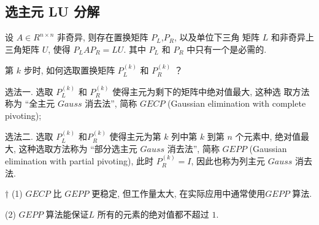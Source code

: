 \documentclass[12pt,a4paper]{article}
\begin{document}
\subsection{选主元 LU 分解}

\begin{theorem}
	设 $A ∈ R^{n×n}$ 非奇异, 则存在置换矩阵 $P_L$,$ P_R$, 以及单位下三角
	矩阵 $L$ 和非奇异上三角矩阵 $U$, 使得 $P_LAP_R = LU$. 其中 $P_L$ 和 $P_R$ 中只有一个是必需的.
\end{theorem}


第 $k$ 步时, 如何选取置换矩阵 $P^{(k)}_L$ 和 $P^{(k)}_R$ ？

选法一. 选取 $P^{(k)}_L$ 和 $P^{(k)}_R$ 使得主元为剩下的矩阵中绝对值最大, 这种选
取方法称为 “全主元 $Gauss$ 消去法”, 简称 $GECP$ (Gaussian elimination
with complete pivoting);

选法二. 选取 $P^{(k)}_L$ 和$ P^{(k)}_R$ 使得主元为第 $k$ 列中第 $k$ 到第 $n$ 个元素中, 绝对值最大, 这种选取方法称为 “部分选主元 $Gauss$ 消去法”, 简称 $GEPP$
(Gaussian elimination with partial pivoting), 此时 $P^{(k)}_R = I$, 因此也称为列主元 $Gauss$ 消去法.


† (1) $GECP$ 比 $GEPP$ 更稳定, 但工作量太大, 在实际应用中通常使用$GEPP$ 算法.

(2) $GEPP$ 算法能保证$L$ 所有的元素的绝对值都不超过 $1$.
\end{document}
